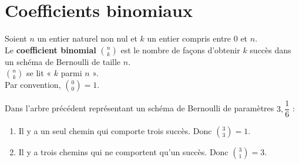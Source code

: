 \documentclass[a4paper,11pt,cours]{nsi} %
\begin{document}
\begin{exemple}
\begin{center}
\end{center}
\end{exemple}

\section{Coefficients binomiaux}
\begin{definition}[]
    Soient $n$ un entier naturel non nul et $k$ un entier compris entre $0$ et $n$.\\
    Le \textbf{coefficient binomial} $\displaystyle\binom{n}{k}$ est le nombre de façons d'obtenir $k$ succès dans un schéma de Bernoulli de taille $n$.\\[.5em]
    $\displaystyle\binom{n}{k}$ se lit « $k$ parmi $n$ ».\\[.5em]
    Par convention, $\displaystyle\binom{0}{0}=1$.
\end{definition}

\begin{exemple}[]
    Dans l'arbre précédent représentant un schéma de Bernoulli de paramètres $3, \dfrac{1}{6}$ :
    \begin{enumerate}[label=\textbullet]
        \item Il y a un seul chemin qui comporte trois succès. Donc $\displaystyle\binom{3}{3}=1$.
        \item Il y a trois chemins qui ne comportent qu'un succès. Donc $\displaystyle\binom{3}{1}=3$.
    \end{enumerate} 
\end{exemple}
\end{document}
